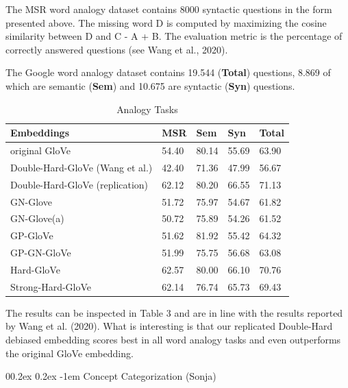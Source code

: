 \documentclass[
  english,
  man,floatsintext]{apa6}
\makeatletter
\let\oldparagraph\paragraph
\renewcommand{\paragraph}[1]{\oldparagraph{#1}\mbox{}}
\renewcommand{\paragraph}{\@startsection{paragraph}{4}{\parindent}%
  {0\baselineskip \@plus 0.2ex \@minus 0.2ex}%
  {-1em}%
  {\normalfont\normalsize\bfseries\itshape\typesectitle}}
\makeatother
\begin{document}
The MSR word analogy dataset contains 8000 syntactic questions in the form presented above. The missing word D is computed by maximizing the cosine similarity between D and C - A + B. The evaluation metric is the percentage of correctly answered questions (see Wang et al., 2020).

The Google word analogy dataset contains 19.544 (\textbf{Total}) questions, 8.869 of which are semantic (\textbf{Sem}) and 10.675 are syntactic (\textbf{Syn}) questions.

\begin{table}[tbp]

\begin{center}
\begin{threeparttable}

\caption{\label{tab:table 3}Analogy Tasks}

\begin{tabular}{lllll}
\toprule
Embeddings & MSR & Sem & Syn & Total\\
\midrule
original GloVe & 54.40 & 80.14 & 55.69 & 63.90\\
Double-Hard-GloVe (Wang et al.) & 42.40 & 71.36 & 47.99 & 56.67\\
Double-Hard-GloVe (replication) & 62.12 & 80.20 & 66.55 & 71.13\\
GN-Glove & 51.72 & 75.97 & 54.67 & 61.82\\
GN-Glove(a) & 50.72 & 75.89 & 54.26 & 61.52\\
GP-GloVe & 51.62 & 81.92 & 55.42 & 64.32\\
GP-GN-GloVe & 51.99 & 75.75 & 56.68 & 63.08\\
Hard-GloVe & 62.57 & 80.00 & 66.10 & 70.76\\
Strong-Hard-GloVe & 62.14 & 76.74 & 65.73 & 69.43\\
\bottomrule
\end{tabular}

\end{threeparttable}
\end{center}

\end{table}

The results can be inspected in Table 3 and are in line with the results reported by Wang et al. (2020). What is interesting is that our replicated Double-Hard debiased embedding scores best in all word analogy tasks and even outperforms the original GloVe embedding.

\hypertarget{concept-categorization-sonja}{%
\paragraph{Concept Categorization (Sonja)}\label{concept-categorization-sonja}}
\end{document}
